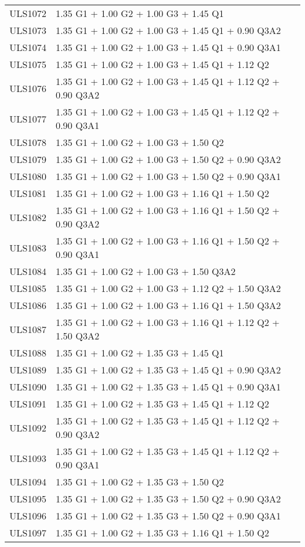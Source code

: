 \begin{center}
\begin{small}
\begin{longtable}{|l|p{10cm}|}
ULS1072 & 1.35 G1 + 1.00 G2 + 1.00 G3 + 1.45 Q1\\
ULS1073 & 1.35 G1 + 1.00 G2 + 1.00 G3 + 1.45 Q1 + 0.90 Q3A2\\
ULS1074 & 1.35 G1 + 1.00 G2 + 1.00 G3 + 1.45 Q1 + 0.90 Q3A1\\
ULS1075 & 1.35 G1 + 1.00 G2 + 1.00 G3 + 1.45 Q1 + 1.12 Q2\\
ULS1076 & 1.35 G1 + 1.00 G2 + 1.00 G3 + 1.45 Q1 + 1.12 Q2 + 0.90 Q3A2\\
ULS1077 & 1.35 G1 + 1.00 G2 + 1.00 G3 + 1.45 Q1 + 1.12 Q2 + 0.90 Q3A1\\
ULS1078 & 1.35 G1 + 1.00 G2 + 1.00 G3 + 1.50 Q2\\
ULS1079 & 1.35 G1 + 1.00 G2 + 1.00 G3 + 1.50 Q2 + 0.90 Q3A2\\
ULS1080 & 1.35 G1 + 1.00 G2 + 1.00 G3 + 1.50 Q2 + 0.90 Q3A1\\
ULS1081 & 1.35 G1 + 1.00 G2 + 1.00 G3 + 1.16 Q1 + 1.50 Q2\\
ULS1082 & 1.35 G1 + 1.00 G2 + 1.00 G3 + 1.16 Q1 + 1.50 Q2 + 0.90 Q3A2\\
ULS1083 & 1.35 G1 + 1.00 G2 + 1.00 G3 + 1.16 Q1 + 1.50 Q2 + 0.90 Q3A1\\
ULS1084 & 1.35 G1 + 1.00 G2 + 1.00 G3 + 1.50 Q3A2\\
ULS1085 & 1.35 G1 + 1.00 G2 + 1.00 G3 + 1.12 Q2 + 1.50 Q3A2\\
ULS1086 & 1.35 G1 + 1.00 G2 + 1.00 G3 + 1.16 Q1 + 1.50 Q3A2\\
ULS1087 & 1.35 G1 + 1.00 G2 + 1.00 G3 + 1.16 Q1 + 1.12 Q2 + 1.50 Q3A2\\
ULS1088 & 1.35 G1 + 1.00 G2 + 1.35 G3 + 1.45 Q1\\
ULS1089 & 1.35 G1 + 1.00 G2 + 1.35 G3 + 1.45 Q1 + 0.90 Q3A2\\
ULS1090 & 1.35 G1 + 1.00 G2 + 1.35 G3 + 1.45 Q1 + 0.90 Q3A1\\
ULS1091 & 1.35 G1 + 1.00 G2 + 1.35 G3 + 1.45 Q1 + 1.12 Q2\\
ULS1092 & 1.35 G1 + 1.00 G2 + 1.35 G3 + 1.45 Q1 + 1.12 Q2 + 0.90 Q3A2\\
ULS1093 & 1.35 G1 + 1.00 G2 + 1.35 G3 + 1.45 Q1 + 1.12 Q2 + 0.90 Q3A1\\
ULS1094 & 1.35 G1 + 1.00 G2 + 1.35 G3 + 1.50 Q2\\
ULS1095 & 1.35 G1 + 1.00 G2 + 1.35 G3 + 1.50 Q2 + 0.90 Q3A2\\
ULS1096 & 1.35 G1 + 1.00 G2 + 1.35 G3 + 1.50 Q2 + 0.90 Q3A1\\
ULS1097 & 1.35 G1 + 1.00 G2 + 1.35 G3 + 1.16 Q1 + 1.50 Q2\\

\end{longtable}
\end{small}
\end{center}
